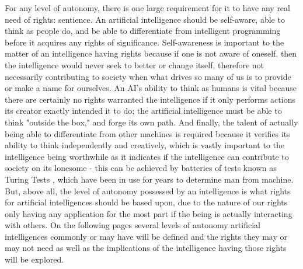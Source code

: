 For any level of autonomy, there is one large requirement for it to have any real need of rights: sentience. An artificial intelligence should be self-aware, able to think as people do, and be able to differentiate from intelligent programming before it acquires any rights of significance. Self-awareness is important to the matter of an intelligence having rights because if one is not aware of oneself, then the intelligence would never seek to better or change itself, therefore not necessarily contributing to society when what drives so many of us is to provide or make a name for ourselves. An AI's ability to think as humans is vital because there are certainly no rights warranted the intelligence if it only performs actions its creator exactly intended it to do; the artificial intelligence must be able to think "outside the box," and forge its own path. And finally, the talent of actually being able to differentiate from other machines is required because it verifies its ability to think independently and creatively, which is vastly important to the intelligence being worthwhile as it indicates if the intelligence can contribute to society on its lonesome - this can be achieved by batteries of tests known as Turing Tests \cite{sep-turing-test}, which have been in use for years to determine man from machine. But, above all, the level of autonomy possessed by an intelligence is what rights for artificial intelligences should be based upon, due to the nature of our rights only having any application for the most part if the being is actually interacting with others. On the following pages several levels of autonomy artificial intelligences commonly or may have will be defined and the rights they may or may not need as well as the implications of the intelligence having those rights will be explored.